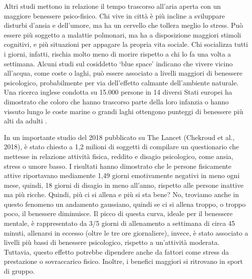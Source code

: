 \documentclass[12pt]{book} %
\begin{document}
\begin{mdframed}[linewidth=1pt]
Altri studi mettono in relazione il tempo trascorso all'aria aperta con un maggiore benessere psico-fisico. Chi vive in
città è più incline a sviluppare disturbi d'ansia e dell'umore, ma ha un cervello che tollera meglio lo stress. Può
essere più soggetto a malattie polmonari, ma ha a disposizione maggiori stimoli cognitivi, e più situazioni per
appagare la propria vita sociale. Chi socializza tutti i giorni, infatti, rischia molto meno di morire rispetto a chi lo fa una
volta a settimana.
Alcuni studi sul cosiddetto ‘blue space’ indicano che vivere vicino all’acqua, come coste o laghi, può essere associato a livelli maggiori di benessere psicologico, probabilmente per via dell’effetto calmante dell’ambiente naturale. Una ricerca inglese condotta su 15.000 persone in 14 diversi Stati europei ha dimostrato che coloro che hanno trascorso parte della loro infanzia o hanno vissuto lungo le coste marine o grandi laghi ottengono punteggi di benessere più alti da adulti .

In un importante studio del 2018 pubblicato su The Lancet (Chekroud et al.,
2018), è stato chiesto a 1,2 milioni
di soggetti di compilare un questionario che mettesse in relazione attività fisica, reddito e disagio psicologico, come
ansia, stress o umore basso. I risultati hanno dimostrato che le persone fisicamente attive riportavano mediamente 1,49
giorni emotivamente negativi in meno ogni mese, quindi, 18 giorni di disagio in meno all'anno,
rispetto alle persone inattive ma più ricche. Quindi, più ci si allena e più si sta bene? No, troviamo anche in questo
fenomeno un andamento gaussiano, quindi se ci si allena troppo, o troppo poco, il benessere diminuisce. Il picco di
questa curva, ideale per il benessere mentale, è rappresentato da 3/5 giorni di allenamento a settimana di circa 45
minuti, allenarsi in eccesso (oltre le tre ore giornaliere), invece, è stato associato a livelli più bassi di benessere psicologico, rispetto a un’attività moderata. Tuttavia, questo effetto potrebbe dipendere anche da fattori come stress da prestazione o sovraccarico fisico. 
Inoltre, i benefici maggiori si ritrovano in sport di gruppo.


\end{mdframed}
\end{document}
